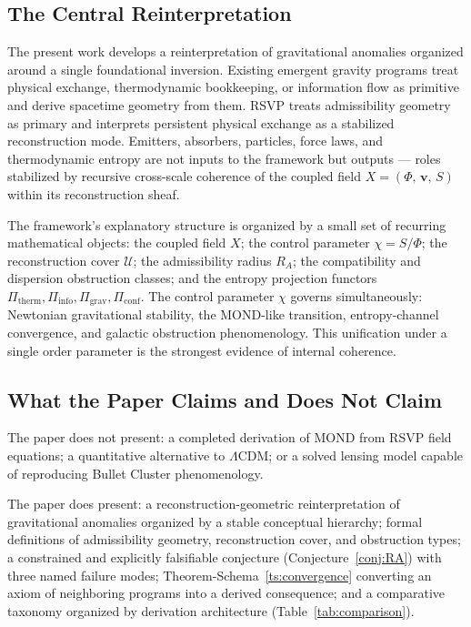 \documentclass[11pt, a4paper]{article}
\theoremstyle{plain}
\theoremstyle{definition}
\theoremstyle{remark}
\newcommand{\Xfield}{X = (\Phi,\,\mathbf{v},\,S)}
\newcommand{\RA}{R_{\!A}}
\newcommand{\Ucover}{\mathcal{U}}
\newcommand{\Pitherm}{\Pi_{\mathrm{therm}}}
\newcommand{\Piinfo}{\Pi_{\mathrm{info}}}
\newcommand{\Pigrav}{\Pi_{\mathrm{grav}}}
\newcommand{\Piconf}{\Pi_{\mathrm{conf}}}
\begin{document}
\subsection{The Central Reinterpretation}

The present work develops a reinterpretation of gravitational anomalies organized
around a single foundational inversion. Existing emergent gravity programs treat
physical exchange, thermodynamic bookkeeping, or information flow as primitive and
derive spacetime geometry from them. RSVP treats admissibility geometry as primary
and interprets persistent physical exchange as a stabilized reconstruction mode.
Emitters, absorbers, particles, force laws, and thermodynamic entropy are not inputs
to the framework but outputs --- roles stabilized by recursive cross-scale coherence
of the coupled field $\Xfield$ within its reconstruction sheaf.

The framework's explanatory structure is organized by a small set of recurring
mathematical objects: the coupled field $X$; the control parameter $\chi = S/\Phi$;
the reconstruction cover $\Ucover$; the admissibility radius $\RA$; the
compatibility and dispersion obstruction classes; and the entropy projection functors
$\Pitherm, \Piinfo, \Pigrav, \Piconf$. The control parameter $\chi$ governs
simultaneously: Newtonian gravitational stability, the MOND-like transition,
entropy-channel convergence, and galactic obstruction phenomenology. This unification
under a single order parameter is the strongest evidence of internal coherence.

\subsection{What the Paper Claims and Does Not Claim}

The paper does not present: a completed derivation of MOND from RSVP field equations;
a quantitative alternative to $\Lambda$CDM; or a solved lensing model capable of
reproducing Bullet Cluster phenomenology.

The paper does present: a reconstruction-geometric reinterpretation of gravitational
anomalies organized by a stable conceptual hierarchy; formal definitions of
admissibility geometry, reconstruction cover, and obstruction types; a constrained
and explicitly falsifiable conjecture (Conjecture~\ref{conj:RA}) with three named
failure modes; Theorem-Schema~\ref{ts:convergence} converting an axiom of neighboring
programs into a derived consequence; and a comparative taxonomy organized by
derivation architecture (Table~\ref{tab:comparison}).
\end{document}
